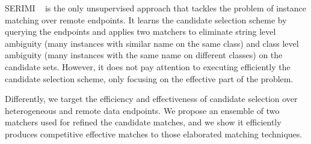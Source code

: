 SERIMI ~\cite{serimi} is the only unsupervised approach that tackles the problem of instance matching over remote endpoints. It learns the candidate selection scheme by querying the endpoints and applies two matchers to eliminate string level ambiguity (many instances with similar name on the same class) and class level ambiguity (many instances with the same name on different classes) on the candidate sets. However, it does not pay attention to executing efficiently the candidate selection scheme, only focusing on the effective part of the problem. 

Differently, we target the efficiency and effectiveness of candidate selection over heterogeneous and remote data endpoints. We propose an ensemble of two matchers used for refined the candidate matches, and we show it efficiently produces competitive effective matches to those elaborated matching techniques.

 